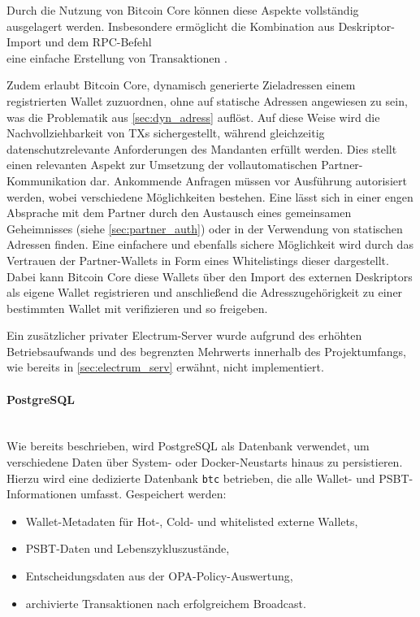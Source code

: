 Durch die Nutzung von Bitcoin Core können diese Aspekte vollständig ausgelagert werden.
Insbesondere ermöglicht die Kombination aus Deskriptor-Import und dem \ac{RPC}-Befehl \\ eine einfache Erstellung von Transaktionen \cite{bitcoincore_walletcreatefundedpsbt}.

Zudem erlaubt Bitcoin Core, dynamisch generierte Zieladressen einem registrierten Wallet zuzuordnen, ohne auf statische Adressen angewiesen zu sein, was die Problematik aus \ref{sec:dyn_adress} auflöst. Auf diese Weise wird die Nachvollziehbarkeit von \acp{TX} sichergestellt, während gleichzeitig datenschutzrelevante Anforderungen des Mandanten erfüllt werden.
Dies stellt einen relevanten Aspekt zur Umsetzung der vollautomatischen Partner-Kommunikation dar. Ankommende Anfragen müssen vor Ausführung autorisiert werden, wobei verschiedene Möglichkeiten bestehen. Eine lässt sich in einer engen Absprache mit dem Partner durch den Austausch eines gemeinsamen Geheimnisses (siehe \ref{sec:partner_auth}) oder in der Verwendung von statischen Adressen finden.
Eine einfachere und ebenfalls sichere Möglichkeit wird durch das Vertrauen der Partner-Wallets in Form eines Whitelistings dieser dargestellt. Dabei kann Bitcoin Core diese Wallets über den Import des externen Deskriptors als eigene Wallet registrieren und anschließend die Adresszugehörigkeit zu einer bestimmten Wallet mit  verifizieren und so freigeben.

Ein zusätzlicher privater Electrum-Server wurde aufgrund des erhöhten Betriebsaufwands und des begrenzten Mehrwerts innerhalb des Projektumfangs, wie bereits in \ref{sec:electrum_serv} erwähnt, nicht implementiert.

\paragraph{PostgreSQL} \label{sec:btc_db} \mbox{}\\
Wie bereits beschrieben, wird PostgreSQL als Datenbank verwendet, um verschiedene Daten über System- oder Docker-Neustarts hinaus zu persistieren.
Hierzu wird eine dedizierte Datenbank \texttt{btc} betrieben, die alle Wallet- und \ac{PSBT}-Informationen umfasst.
Gespeichert werden:
\begin{itemize}
    \item Wallet-Metadaten für Hot-, Cold- und whitelisted externe Wallets,
    \item \ac{PSBT}-Daten und Lebenszykluszustände,
    \item Entscheidungsdaten aus der \ac{OPA}-Policy-Auswertung,
    \item archivierte Transaktionen nach erfolgreichem Broadcast.
\end{itemize}

